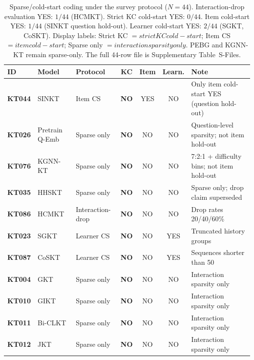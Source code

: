 \documentclass[lettersize,journal]{IEEEtran}
\begin{document}
\begin{table}[t]
\caption{Sparse/cold-start coding under the survey protocol ($N=44$). Interaction-drop evaluation YES: $1/44$ (HCMKT). Strict KC cold-start YES: $0/44$. Item cold-start YES: $1/44$ (SINKT question hold-out). Learner cold-start YES: $2/44$ (SGKT, CoSKT). Display labels: Strict KC $=strict KC cold-start$; Item CS $=item cold-start$; Sparse only $=interaction sparsity only$. PEBG and KGNN-KT remain sparse-only. The full 44-row file is Supplementary Table~S-Files.}
\label{tab:sparse_taxonomy}
\centering
\footnotesize
\setlength{\tabcolsep}{3.2pt}
\begin{tabular}{@{}ll l ccc p{3.55cm}@{}}
\toprule
\textbf{ID} & \textbf{Model} & \textbf{Protocol} & \textbf{KC} & \textbf{Item} & \textbf{Learn.} & \textbf{Note} \\
\midrule
\textbf{KT044} & SINKT \cite{KT044_SINKT_2024} & Item CS & \textbf{NO} & YES & NO & Only item cold-start YES (question hold-out) \\
\textbf{KT026} & Pretrain Q-Emb \cite{KT026_PretrainQ_2020} & Sparse only & \textbf{NO} & NO & NO & Question-level sparsity; not item hold-out \\
\textbf{KT076} & KGNN-KT \cite{KT076_KGNNKT_2025} & Sparse only & \textbf{NO} & NO & NO & 7:2:1 + difficulty bins; not item hold-out \\
\textbf{KT035} & HHSKT \cite{KT035_HHSKT_2023} & Sparse only & \textbf{NO} & NO & NO & Sparse only; drop claim superseded \\
\textbf{KT086} & HCMKT \cite{HCMKT_2026} & Interaction-drop & \textbf{NO} & NO & NO & Drop rates 20/40/60\% \\
\textbf{KT023} & SGKT \cite{KT023_SGKT_2022} & Learner CS & \textbf{NO} & NO & YES & Truncated history groups \\
\textbf{KT087} & CoSKT \cite{CoSKT_2024} & Learner CS & \textbf{NO} & NO & YES & Sequences shorter than 50 \\
\textbf{KT004} & GKT \cite{KT004_GKT_2019} & Sparse only & \textbf{NO} & NO & NO & Interaction sparsity only \\
\textbf{KT010} & GIKT \cite{KT010_GIKT_2021} & Sparse only & \textbf{NO} & NO & NO & Interaction sparsity only \\
\textbf{KT011} & Bi-CLKT \cite{KT011_BiCLKT_2022} & Sparse only & \textbf{NO} & NO & NO & Interaction sparsity only \\
\textbf{KT012} & JKT \cite{KT012_JKT_2021} & Sparse only & \textbf{NO} & NO & NO & Interaction sparsity only \\

\end{tabular}
\end{table}
\end{document}
